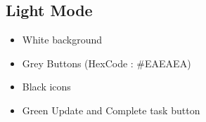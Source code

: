 \subsection{Light Mode}
\begin{itemize}
\item White background
\item Grey Buttons (HexCode : \#EAEAEA)
\item Black icons
\item Green Update and Complete task button
\end{itemize}
